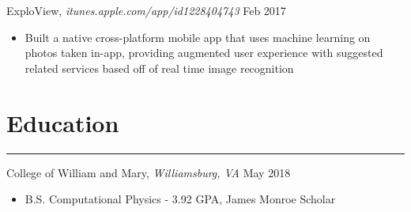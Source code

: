 \documentclass[12pt]{article}
\begin{document}
\noindent ExploView, \textit{itunes.apple.com/app/id1228404743} \hfill Feb 2017
\vspace{-0.2cm}
\begin{itemize}
  \itemsep-0.4em
        \item Built a native cross-platform mobile app that uses machine learning on photos taken in-app, providing augmented user experience with suggested related services based off of real time image recognition
\end{itemize}



\vspace{-0.50cm}
\section*{Education}
\vspace{-0.2cm}
\hrule
\vspace{0.25cm}

\noindent College of William and Mary, \textit{Williamsburg, VA} \hfill May 2018
\vspace{-0.2cm}
\begin{itemize}
  \itemsep-0.4em
        \item B.S. Computational Physics - 3.92 GPA, James Monroe Scholar
\end{itemize}
\end{document}
